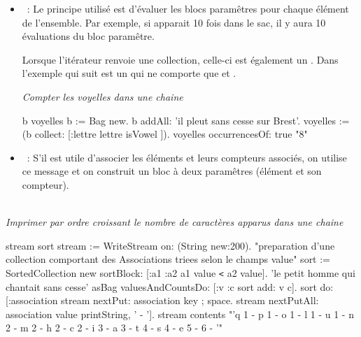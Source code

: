 \begin{itemize}

\item {}~:
Le principe utilis\'e est d'\'evaluer les blocs param\^etres pour chaque \'el\'ement
de l'ensemble. Par exemple, si  apparait 10 fois dans le sac, il
y aura 10 \'evaluations du bloc param\^etre.

Lorsque l'it\'erateur renvoie une collection, celle-ci est \'egalement un .
Dans l'exemple qui suit  est un  qui ne comporte que 
 et .

{\em Compter les voyelles dans une chaine}
\begin{scode}
\stBar b voyelles \stBar
    b := Bag new.
    b addAll: 'il pleut sans cesse sur Brest'.
    voyelles := (b collect: [:lettre \stBar lettre isVowel ]).
    voyelles occurrencesOf: true 
    "8"
\end{scode}

\item {}~: S'il est utile d'associer les \'el\'ements
et leurs compteurs associ\'es, on utilise ce message et on construit un bloc
\`a deux param\^etres (\'el\'ement et son compteur).


\end{itemize}
~\\{\em Imprimer par ordre croissant le nombre de caract\`eres apparus dans une chaine}
\begin{scode}

\stBar stream sort \stBar
stream := WriteStream on: (String new:200).
"preparation d'une collection comportant des Associations triees selon le champs value"
sort := SortedCollection new sortBlock: [:a1 :a2 \stBar a1 value \texttt{<} a2 value].
'le petit homme qui chantait sans cesse' asBag valuesAndCountsDo: [:v :c \stBar sort add: v\assoc{} c].
sort do: [:association \stBar stream nextPut: association key ; space.
     stream nextPutAll: association value printString, ' - '].
     stream contents 
"'q 1 - p 1 - o 1 - l 1 - u 1 - n 2 - m 2 - h 2 - c 2 - 
  i 3 - a 3 - t 4 - s 4 - e 5 -   6 - '"
\end{scode}





